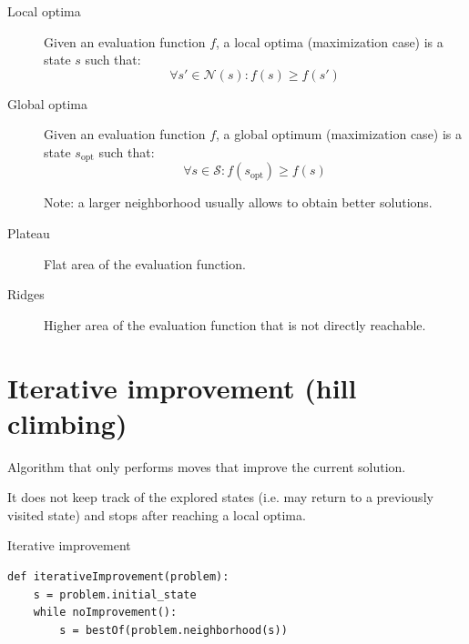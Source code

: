 \begin{description}
        
    \item[Local optima]
    Given an evaluation function $f$,
    a local optima (maximization case) is a state $s$ such that:
    \[ \forall s' \in \mathcal{N}(s): f(s) \geq f(s') \]

    \item[Global optima]
        Given an evaluation function $f$,
        a global optimum (maximization case) is a state $s_\text{opt}$ such that:
        \[ \forall s \in \mathcal{S}: f(s_\text{opt}) \geq f(s) \]

        Note: a larger neighborhood usually allows to obtain better solutions.

    \item[Plateau]
        Flat area of the evaluation function.

    \item[Ridges]
        Higher area of the evaluation function that is not directly reachable.
\end{description}



\section{Iterative improvement (hill climbing)}
Algorithm that only performs moves that improve the current solution.

It does not keep track of the explored states (i.e. may return to a previously visited state) and 
stops after reaching a local optima.

\begin{algorithm}
\caption{Iterative improvement}
\begin{lstlisting}
def iterativeImprovement(problem):
    s = problem.initial_state
    while noImprovement():
        s = bestOf(problem.neighborhood(s))
\end{lstlisting}
\end{algorithm}



